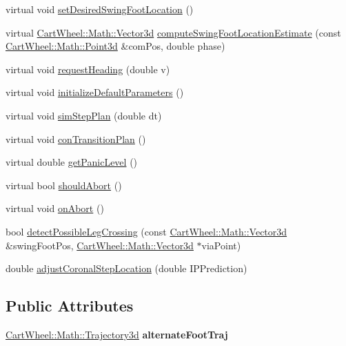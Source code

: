 \begin{DoxyCompactItemize}
\item 
virtual void \hyperlink{classCartWheel_1_1Core_1_1BehaviourController_a335b40febfbe741f290367a2ad59b38a}{setDesiredSwingFootLocation} ()
\item 
virtual \hyperlink{classCartWheel_1_1Math_1_1Vector3d}{CartWheel::Math::Vector3d} \hyperlink{classCartWheel_1_1Core_1_1BehaviourController_a4586a96ada87681f596ab6bd67af4144}{computeSwingFootLocationEstimate} (const \hyperlink{classCartWheel_1_1Math_1_1Point3d}{CartWheel::Math::Point3d} \&comPos, double phase)
\item 
virtual void \hyperlink{classCartWheel_1_1Core_1_1BehaviourController_a9a96dacbf508de76c84fcf494b49c4c9}{requestHeading} (double v)
\item 
virtual void \hyperlink{classCartWheel_1_1Core_1_1BehaviourController_a686bf6e2bc689fef41352eb1fc674884}{initializeDefaultParameters} ()
\item 
virtual void \hyperlink{classCartWheel_1_1Core_1_1BehaviourController_a5a0b7293c3693f7a5860ae51bb65164e}{simStepPlan} (double dt)
\item 
virtual void \hyperlink{classCartWheel_1_1Core_1_1BehaviourController_a26bfe1b24d791e35c78ce0dff3c7b274}{conTransitionPlan} ()
\item 
virtual double \hyperlink{classCartWheel_1_1Core_1_1BehaviourController_aa8e43483e51a9cd697fa33a0674abccc}{getPanicLevel} ()
\item 
virtual bool \hyperlink{classCartWheel_1_1Core_1_1BehaviourController_a0517693f7fe1a850ac9c18755e918672}{shouldAbort} ()
\item 
virtual void \hyperlink{classCartWheel_1_1Core_1_1BehaviourController_ab6cb617fcd5939770b3a11b58ef757f3}{onAbort} ()
\item 
bool \hyperlink{classCartWheel_1_1Core_1_1BehaviourController_a9ffe7d486caaf1165e0d125bed747718}{detectPossibleLegCrossing} (const \hyperlink{classCartWheel_1_1Math_1_1Vector3d}{CartWheel::Math::Vector3d} \&swingFootPos, \hyperlink{classCartWheel_1_1Math_1_1Vector3d}{CartWheel::Math::Vector3d} $\ast$viaPoint)
\item 
double \hyperlink{classCartWheel_1_1Core_1_1BehaviourController_ad7a2bc712fb9d9ef3c1a367461f8c696}{adjustCoronalStepLocation} (double IPPrediction)
\end{DoxyCompactItemize}
\subsection*{Public Attributes}
\begin{DoxyCompactItemize}
\item 
\hypertarget{classCartWheel_1_1Core_1_1BehaviourController_a7cb9780f801e296e58b443a822e65a0b}{
\hyperlink{classCartWheel_1_1Math_1_1GenericTrajectory}{CartWheel::Math::Trajectory3d} {\bfseries alternateFootTraj}}
\label{classCartWheel_1_1Core_1_1BehaviourController_a7cb9780f801e296e58b443a822e65a0b}

\end{DoxyCompactItemize}
